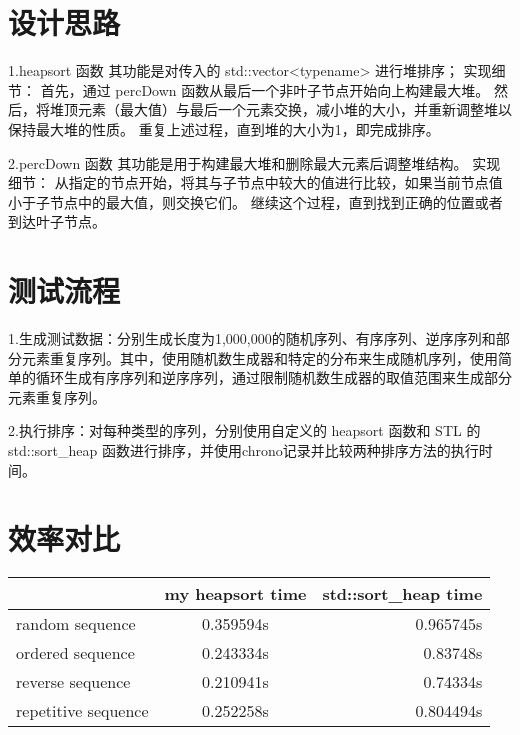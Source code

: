 \documentclass[UTF8]{ctexart}
\begin{document}
\pagestyle{fancy}
\fancyhead{}

\section{设计思路}
1.heapsort 函数
其功能是对传入的 std::vector<typename> 进行堆排序；
实现细节：
首先，通过 percDown 函数从最后一个非叶子节点开始向上构建最大堆。
然后，将堆顶元素（最大值）与最后一个元素交换，减小堆的大小，并重新调整堆以保持最大堆的性质。
重复上述过程，直到堆的大小为1，即完成排序。

2.percDown 函数
其功能是用于构建最大堆和删除最大元素后调整堆结构。
实现细节：
从指定的节点开始，将其与子节点中较大的值进行比较，如果当前节点值小于子节点中的最大值，则交换它们。
继续这个过程，直到找到正确的位置或者到达叶子节点。

\section{测试流程}

1.生成测试数据：分别生成长度为1,000,000的随机序列、有序序列、逆序序列和部分元素重复序列。其中，使用随机数生成器和特定的分布来生成随机序列，使用简单的循环生成有序序列和逆序序列，通过限制随机数生成器的取值范围来生成部分元素重复序列。


2.执行排序：对每种类型的序列，分别使用自定义的 heapsort 函数和 STL 的 std::sort\_heap 函数进行排序，并使用chrono记录并比较两种排序方法的执行时间。


\section{效率对比}
\begin{table}[h!]
	\begin{center}
		\begin{tabular}{|l|c|r|} 
			\hline
			\textbf{ } & \textbf{my heapsort time} & \textbf{std::sort\_heap time}\\
			\hline
			random sequence & 0.359594s & 0.965745s\\
			\hline
			ordered sequence & 0.243334s & 0.83748s\\
			\hline
			reverse sequence & 0.210941s & 0.74334s\\
			\hline
			repetitive sequence & 0.252258s & 0.804494s\\
			\hline
		\end{tabular}
	\end{center}
\end{table}
\end{document}
